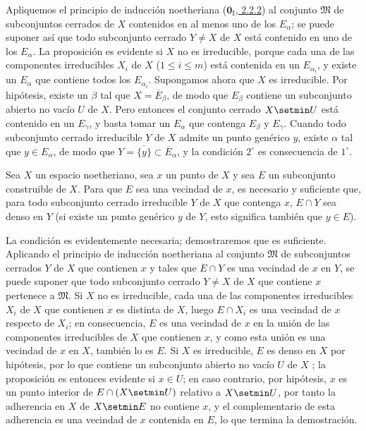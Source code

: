 Apliquemos el principio de inducción noetheriana
(\hyperref[0.2.2.2-fr]{$\mathbf{0}_{\mathrm I}$, 2.2.2}) al conjunto
$\mathfrak{M}$ de subconjuntos cerrados de $X$ contenidos en al menos uno de los $E_\alpha$; se puede suponer así que todo subconjunto cerrado $Y\ne X$ de $X$ está contenido en uno de los $E_\alpha$.
La proposición es evidente si $X$ no es irreducible, porque cada una de las componentes irreducibles $X_i$ de $X$ ($1\leq i\leq m$) está contenida en un $E_{\alpha_i}$, y existe un $E_\alpha$ que contiene todos los $E_{\alpha_i}$.
Supongamos ahora que $X$ es irreducible.
Por hipótesis, existe un $\beta$ tal que $X=\overline{E}_\beta$, de modo que  $E_\beta$ contiene un subconjunto abierto no vacío $U$ de $X$.
Pero entonces el conjunto cerrado $X\setmin U$ está contenido en un $E_\gamma$, y basta tomar un $E_\alpha$ que contenga $E_\beta$ y $E_\gamma$.
Cuando todo subconjunto cerrado irreducible $Y$ de $X$
admite un punto genérico $y$, existe $\alpha$ tal que $y\in E_\alpha$, de modo que $Y=\overline{\{y\}}\subset\overline{E}_\alpha$, y la condición $2^\circ$ es consecuencia de $1^\circ$.

\begin{proposition}[9.2.5]
\label{0.9.2.5}
\label{0.9.2.5-fr}
Sea $X$ un espacio noetheriano, sea $x$ un punto de $X$ y sea $E$ un subconjunto construible de $X$.
Para que $E$ sea una vecindad de $x$, es necesario y suficiente que, para todo subconjunto cerrado irreducible $Y$ de $X$ que contenga $x$, $E\cap Y$ sea denso en $Y$ (si existe un punto genérico $y$ de $Y$, esto significa también  que $y\in E$).
\end{proposition}


La condición es evidentemente necesaria; demostraremos que es suficiente.
Aplicando el principio de inducción noetheriana al conjunto $\mathfrak{M}$ de subconjuntos cerrados $Y$ de $X$ que contienen $x$ y tales que $E\cap Y$ es una vecindad de $x$ en $Y$, se puede suponer que todo subconjunto cerrado $Y\ne X$ de $X$ que contiene $x$ pertenece a $\mathfrak{M}$.
Si $X$ no es irreducible, cada una de las componentes irreducibles $X_i$ de $X$ que contienen $x$ es distinta de $X$, luego $E\cap X_i$ es una vecindad de $x$ respecto de $X_i$; en consecuencia, $E$ es una vecindad de $x$ en la unión de las componentes irreducibles de $X$ que contienen $x$, y como esta unión es una vecindad de $x$ en $X$, también lo es $E$.
Si $X$ es irreducible, $E$ es denso en $X$ por hipótesis, por lo que contiene un subconjunto abierto no vacío $U$ de $X$ ; la proposición es entonces evidente si $x\in U$; en caso contrario, por hipótesis, $x$ es un punto interior de $E\cap(X\setmin U)$ relativo a $X\setmin U$, por tanto la adherencia en
$X$ de $X\setmin E$ no contiene $x$, y el complementario de esta adherencia es una vecindad de $x$ contenida en $E$, lo que termina la demostración.


